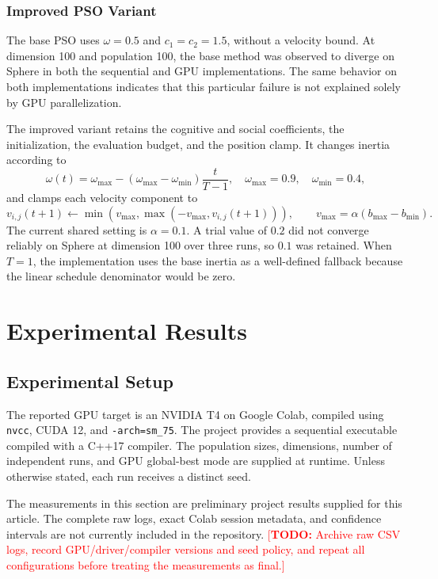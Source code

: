 \documentclass[conference]{IEEEtran}
\newcommand{\todo}[1]{\textcolor{red}{[\textbf{TODO:} #1]}}
\begin{document}
\subsubsection{Improved PSO Variant}
\label{sec:pso-improved}
The base PSO uses $\omega=0.5$ and $c_1=c_2=1.5$, without a velocity bound.
At dimension 100 and population 100, the base method was observed to diverge
on Sphere in both the sequential and GPU implementations. The same behavior
on both implementations indicates that this particular failure is not
explained solely by GPU parallelization.

The improved variant retains the cognitive and social coefficients, the
initialization, the evaluation budget, and the position clamp. It changes
inertia according to
\begin{equation}
  \omega(t)=\omega_{\max}
  -(\omega_{\max}-\omega_{\min})\frac{t}{T-1},
  \quad \omega_{\max}=0.9,\quad \omega_{\min}=0.4,
\end{equation}
and clamps each velocity component to
\begin{equation}
  v_{i,j}(t+1)\leftarrow
  \min\!\left(v_{\max},\max(-v_{\max},v_{i,j}(t+1))\right),
  \qquad
  v_{\max}=\alpha(b_{\max}-b_{\min}).
\end{equation}
The current shared setting is $\alpha=0.1$. A trial value of $0.2$ did not
converge reliably on Sphere at dimension 100 over three runs, so $0.1$ was
retained. When $T=1$, the implementation uses the base inertia as a
well-defined fallback because the linear schedule denominator would be zero.

\section{Experimental Results}
\label{sec:results}
\subsection{Experimental Setup}
\label{sec:setup}
The reported GPU target is an NVIDIA T4 on Google Colab, compiled using
\texttt{nvcc}, CUDA 12, and \texttt{-arch=sm\_75}. The project provides a
sequential executable compiled with a C++17 compiler. The population sizes,
dimensions, number of independent runs, and GPU global-best mode are supplied
at runtime. Unless otherwise stated, each run receives a distinct seed.

The measurements in this section are preliminary project results supplied
for this article. The complete raw logs, exact Colab session metadata, and
confidence intervals are not currently included in the repository.
\todo{Archive raw CSV logs, record GPU/driver/compiler versions and seed
policy, and repeat all configurations before treating the measurements as
final.}
\end{document}
